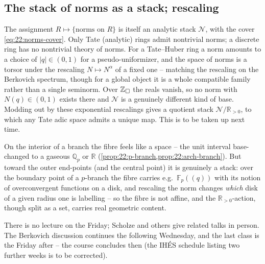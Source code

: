 \subsection{The stack of norms as a stack; rescaling}
\label{subsec:22:closing}

\begin{remark}
\label{rmk:22:tate-norms}
The assignment $R\mapsto\{\text{norms on }R\}$ is itself an analytic stack
$\mathcal N$, with the cover \eqref{eq:22:norms-cover}. Only Tate (analytic)
rings admit nontrivial norms; a discrete ring has no nontrivial theory of norms.
For a Tate--Huber ring a norm amounts to a choice of $|q|\in(0,1)$ for a
pseudo-uniformizer, and the space of norms is a torsor under the rescaling
$N\mapsto N^{\alpha}$ of a fixed one -- matching the rescaling on the Berkovich
spectrum, though for a global object it is a whole compatible family rather than
a single seminorm. Over $\mathbb{Z}_{\square}$ the reals vanish, so no norm with
$N(q)\in(0,1)$ exists there and $\mathcal N$ is a genuinely different kind of
base. Modding out by these exponential rescalings gives a quotient stack
$\mathcal N/\mathbb R_{>0}$, to which any Tate adic space admits a unique map.
This is to be taken up next time.
\end{remark}

\begin{remark}
\label{rmk:22:fibres-stacky}
On the interior of a branch the fibre feels like a space -- the unit interval
base-changed to a gaseous $\mathbb Q_p$ or $\mathbb R$
(\cref{prop:22:p-branch,prop:22:arch-branch}). But toward the outer end-points
(and the central point) it is genuinely a stack: over the boundary point of a
$p$-branch the fibre carries e.g.\ $\mathbb F_p(\!(q)\!)$ with its notion of
overconvergent functions on a disk, and rescaling the norm changes \emph{which}
disk of a given radius one is labelling -- so the fibre is not affine, and the
$\mathbb R_{>0}$-action, though split as a set, carries real geometric content.
\end{remark}

\begin{remark}[Administrative]
\label{rmk:22:admin}
There is no lecture on the Friday; Scholze and others give related talks in
person. The Berkovich discussion continues the following Wednesday, and the
last class is the Friday after -- the course concludes then (the IH\'ES
schedule listing two further weeks is to be corrected).
\end{remark}
